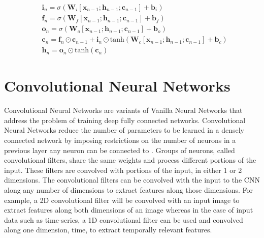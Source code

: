  \begin{equation}
     \begin{split}
         & \mathbf{i}_n  = \sigma(\mathbf{W}_i [\mathbf{x}_{n-1}; \mathbf{h}_{n-1}; \mathbf{c}_{n-1}] + \mathbf{b}_i) \\
         & \mathbf{f}_n  = \sigma(\mathbf{W}_f [\mathbf{x}_{n-1}; \mathbf{h}_{n-1}; \mathbf{c}_{n-1}] + \mathbf{b}_f) \\
         & \mathbf{o}_n  = \sigma(\mathbf{W}_o [\mathbf{x}_{n-1}; \mathbf{h}_{n-1}; \mathbf{c}_{n-1}] + \mathbf{b}_o) \\
         & \mathbf{c}_n =  \mathbf{f}_n \odot \mathbf{c}_{n-1} +  \mathbf{i}_n \odot \mathrm{tanh}(\mathbf{W}_c [\mathbf{x}_{n-1}; \mathbf{h}_{n-1}; \mathbf{c}_{n-1}] + \mathbf{b}_c) \\
         & \mathbf{h}_n =  \mathbf{o}_n \odot \mathrm{tanh}(\mathbf{c}_n)
     \end{split}
 \end{equation}

 \section{Convolutional Neural Networks}
 Convolutional Neural Networks are variants of Vanilla Neural Networks that address the problem of training deep fully connected networks. Convolutional Neural Networks reduce the number of parameters to be learned in a densely connected network by imposing restrictions on the number of neurons in a previous layer any neuron can be connected to \citep{gamboa2017deep}. Groups of neurons, called convolutional filters, share the same weights and process different portions of the input. These filters are convolved with portions of the input, in either 1 or 2 dimensions. The convolutional filters can be convolved with the input to the CNN along any number of dimensions to extract features along those dimensions. For example, a 2D convolutional filter will be convolved with an input image to extract features along both dimensions of an image whereas in the case of input data such as time-series, a 1D convolutional filter can be used and convolved along one dimension, time, to extract temporally relevant features.